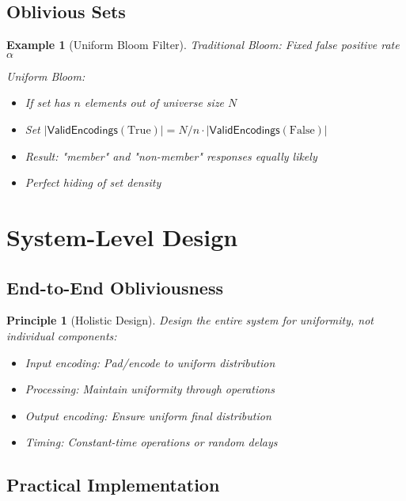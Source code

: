 \documentclass[11pt,final]{article}
\newcommand{\ValidEnc}[1]{\mathsf{ValidEncodings}(#1)}
\newtheorem{example}[theorem]{Example}
\newtheorem{principle}[theorem]{Principle}
\begin{document}
\subsection{Oblivious Sets}

\begin{example}[Uniform Bloom Filter]
Traditional Bloom: Fixed false positive rate $\alpha$

Uniform Bloom:
\begin{itemize}
    \item If set has $n$ elements out of universe size $N$
    \item Set $|\ValidEnc{\text{True}}| = N/n \cdot |\ValidEnc{\text{False}}|$
    \item Result: "member" and "non-member" responses equally likely
    \item Perfect hiding of set density
\end{itemize}
\end{example}

\section{System-Level Design}

\subsection{End-to-End Obliviousness}

\begin{principle}[Holistic Design]
Design the entire system for uniformity, not individual components:
\begin{itemize}
    \item Input encoding: Pad/encode to uniform distribution
    \item Processing: Maintain uniformity through operations
    \item Output encoding: Ensure uniform final distribution
    \item Timing: Constant-time operations or random delays
\end{itemize}
\end{principle}

\subsection{Practical Implementation}
\end{document}
